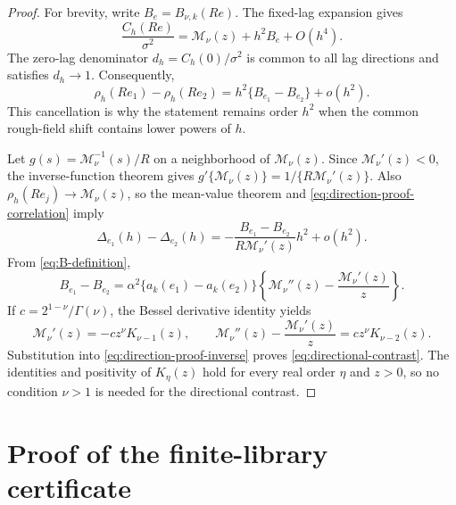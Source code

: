 \documentclass[11pt]{article}
\theoremstyle{remark}
\newcommand{\Matern}{\mathcal M}
\begin{document}
\begin{proof}
For brevity, write \(B_e=B_{\nu,k}(Re)\).  The fixed-lag expansion gives
\begin{equation}
  \frac{C_h(Re)}{\sigma^2}=\Matern_\nu(z)+h^2B_e+O(h^4).
\end{equation}
The zero-lag denominator \(d_h=C_h(0)/\sigma^2\) is common to all lag directions and
satisfies \(d_h\to1\).  Consequently,
\begin{equation}
  \rho_h(Re_1)-\rho_h(Re_2)
  =h^2\{B_{e_1}-B_{e_2}\}+o(h^2).
  \label{eq:direction-proof-correlation}
\end{equation}
This cancellation is why the statement remains order \(h^2\) when the common
rough-field shift contains lower powers of \(h\).

Let \(g(s)=\Matern_\nu^{-1}(s)/R\) on a neighborhood of
\(\Matern_\nu(z)\).  Since \(\Matern_\nu'(z)<0\), the inverse-function theorem
gives \(g'\{\Matern_\nu(z)\}=1/\{R\Matern_\nu'(z)\}\).  Also
\(\rho_h(Re_j)\to\Matern_\nu(z)\), so the mean-value theorem and
\eqref{eq:direction-proof-correlation} imply
\begin{equation}
  \Delta_{e_1}(h)-\Delta_{e_2}(h)
  =-\frac{B_{e_1}-B_{e_2}}{R\Matern_\nu'(z)}h^2+o(h^2).
  \label{eq:direction-proof-inverse}
\end{equation}
From \eqref{eq:B-definition},
\begin{equation}
  B_{e_1}-B_{e_2}
  =\alpha^2\{a_k(e_1)-a_k(e_2)\}
  \left\{\Matern_\nu''(z)-\frac{\Matern_\nu'(z)}z\right\}.
\end{equation}
If \(c=2^{1-\nu}/\Gamma(\nu)\), the Bessel derivative identity yields
\begin{equation}
  \Matern_\nu'(z)=-cz^\nu K_{\nu-1}(z),\qquad
  \Matern_\nu''(z)-\frac{\Matern_\nu'(z)}z
  =cz^\nu K_{\nu-2}(z).
\end{equation}
Substitution into \eqref{eq:direction-proof-inverse} proves
\eqref{eq:directional-contrast}.  The identities and positivity of
\(K_\eta(z)\) hold for every real order \(\eta\) and \(z>0\), so no condition
\(\nu>1\) is needed for the directional contrast.
\end{proof}

\section{Proof of the finite-library certificate}
\label{app:finite-library-proof}
\end{document}
